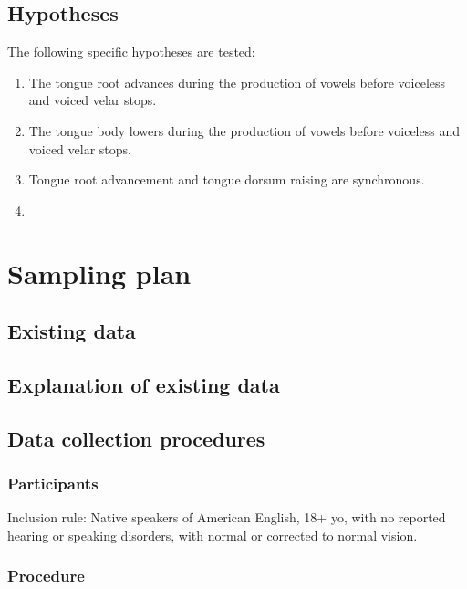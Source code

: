 \documentclass[11pt,]{article}
\begin{document}
\subsection{Hypotheses}\label{hypotheses}

The following specific hypotheses are tested:

\begin{enumerate}
\def\labelenumi{\arabic{enumi}.}
\item
  The tongue root advances during the production of vowels before
  voiceless and voiced velar stops.
\item
  The tongue body lowers during the production of vowels before
  voiceless and voiced velar stops.
\item
  Tongue root advancement and tongue dorsum raising are synchronous.
\item
\end{enumerate}

\section{Sampling plan}\label{sampling-plan}

\subsection{Existing data}\label{existing-data}

\subsection{Explanation of existing
data}\label{explanation-of-existing-data}

\subsection{Data collection
procedures}\label{data-collection-procedures}

\subsubsection{Participants}\label{participants}

Inclusion rule: Native speakers of American English, 18+ yo, with no
reported hearing or speaking disorders, with normal or corrected to
normal vision.

\subsubsection{Procedure}\label{procedure}
\end{document}
